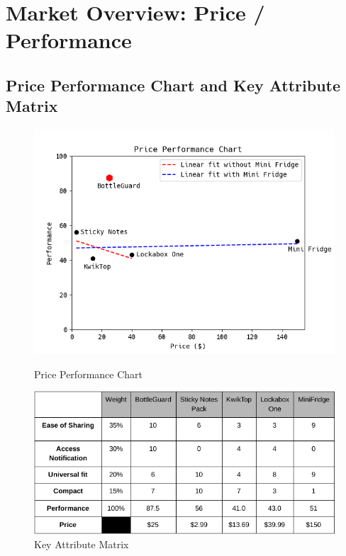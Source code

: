 \documentclass[12pt]{article}
\begin{document}
	\section*{Market Overview: Price / Performance}
	\subsection*{Price Performance Chart and Key Attribute Matrix}
	\begin{figure}[H]
		\includegraphics[width=\textwidth]{e185ew.png}
		\label{fig:ppc}
		\caption{Price Performance Chart}
	\end{figure}
\begin{figure}[H]
	\includegraphics[width=\textwidth]{kam.png}

	\caption{Key Attribute Matrix}
		\label{fig:kam}
\end{figure}
\end{document}
